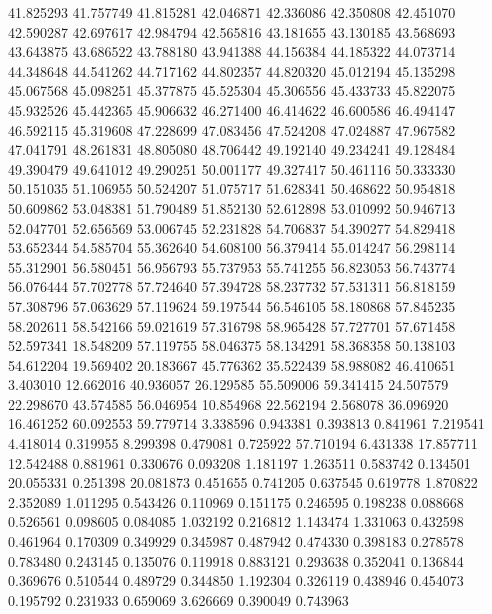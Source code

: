 41.825293
41.757749
41.815281
42.046871
42.336086
42.350808
42.451070
42.590287
42.697617
42.984794
42.565816
43.181655
43.130185
43.568693
43.643875
43.686522
43.788180
43.941388
44.156384
44.185322
44.073714
44.348648
44.541262
44.717162
44.802357
44.820320
45.012194
45.135298
45.067568
45.098251
45.377875
45.525304
45.306556
45.433733
45.822075
45.932526
45.442365
45.906632
46.271400
46.414622
46.600586
46.494147
46.592115
45.319608
47.228699
47.083456
47.524208
47.024887
47.967582
47.041791
48.261831
48.805080
48.706442
49.192140
49.234241
49.128484
49.390479
49.641012
49.290251
50.001177
49.327417
50.461116
50.333330
50.151035
51.106955
50.524207
51.075717
51.628341
50.468622
50.954818
50.609862
53.048381
51.790489
51.852130
52.612898
53.010992
50.946713
52.047701
52.656569
53.006745
52.231828
54.706837
54.390277
54.829418
53.652344
54.585704
55.362640
54.608100
56.379414
55.014247
56.298114
55.312901
56.580451
56.956793
55.737953
55.741255
56.823053
56.743774
56.076444
57.702778
57.724640
57.394728
58.237732
57.531311
56.818159
57.308796
57.063629
57.119624
59.197544
56.546105
58.180868
57.845235
58.202611
58.542166
59.021619
57.316798
58.965428
57.727701
57.671458
52.597341
18.548209
57.119755
58.046375
58.134291
58.368358
50.138103
54.612204
19.569402
20.183667
45.776362
35.522439
58.988082
46.410651
3.403010
12.662016
40.936057
26.129585
55.509006
59.341415
24.507579
22.298670
43.574585
56.046954
10.854968
22.562194
2.568078
36.096920
16.461252
60.092553
59.779714
3.338596
0.943381
0.393813
0.841961
7.219541
4.418014
0.319955
8.299398
0.479081
0.725922
57.710194
6.431338
17.857711
12.542488
0.881961
0.330676
0.093208
1.181197
1.263511
0.583742
0.134501
20.055331
0.251398
20.081873
0.451655
0.741205
0.637545
0.619778
1.870822
2.352089
1.011295
0.543426
0.110969
0.151175
0.246595
0.198238
0.088668
0.526561
0.098605
0.084085
1.032192
0.216812
1.143474
1.331063
0.432598
0.461964
0.170309
0.349929
0.345987
0.487942
0.474330
0.398183
0.278578
0.783480
0.243145
0.135076
0.119918
0.883121
0.293638
0.352041
0.136844
0.369676
0.510544
0.489729
0.344850
1.192304
0.326119
0.438946
0.454073
0.195792
0.231933
0.659069
3.626669
0.390049
0.743963
